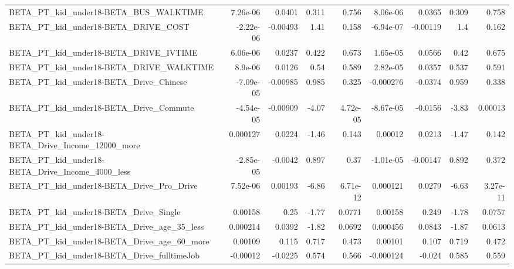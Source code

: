 \begin{tabular}{lrrrrrrrr}
BETA\_PT\_kid\_under18-BETA\_BUS\_WALKTIME              &    7.26e-06 &       0.0401 &     0.311 &    0.756 &   8.06e-06 &      0.0365 &        0.309 &         0.758 \\
BETA\_PT\_kid\_under18-BETA\_DRIVE\_COST                &   -2.22e-06 &     -0.00493 &      1.41 &    0.158 &  -6.94e-07 &    -0.00119 &          1.4 &         0.162 \\
BETA\_PT\_kid\_under18-BETA\_DRIVE\_IVTIME              &    6.06e-06 &       0.0237 &     0.422 &    0.673 &   1.65e-05 &      0.0566 &         0.42 &         0.675 \\
BETA\_PT\_kid\_under18-BETA\_DRIVE\_WALKTIME            &     8.9e-06 &       0.0126 &      0.54 &    0.589 &   2.82e-05 &      0.0357 &        0.537 &         0.591 \\
BETA\_PT\_kid\_under18-BETA\_Drive\_Chinese             &   -7.09e-05 &     -0.00985 &     0.985 &    0.325 &  -0.000276 &     -0.0374 &        0.959 &         0.338 \\
BETA\_PT\_kid\_under18-BETA\_Drive\_Commute             &   -4.54e-05 &     -0.00909 &     -4.07 & 4.72e-05 &  -8.67e-05 &     -0.0156 &        -3.83 &       0.00013 \\
BETA\_PT\_kid\_under18-BETA\_Drive\_Income\_12000\_more   &    0.000127 &       0.0224 &     -1.46 &    0.143 &    0.00012 &      0.0213 &        -1.47 &         0.142 \\
BETA\_PT\_kid\_under18-BETA\_Drive\_Income\_4000\_less    &   -2.85e-05 &      -0.0042 &     0.897 &     0.37 &  -1.01e-05 &    -0.00147 &        0.892 &         0.372 \\
BETA\_PT\_kid\_under18-BETA\_Drive\_Pro\_Drive           &    7.52e-06 &      0.00193 &     -6.86 & 6.71e-12 &   0.000121 &      0.0279 &        -6.63 &      3.27e-11 \\
BETA\_PT\_kid\_under18-BETA\_Drive\_Single              &     0.00158 &         0.25 &     -1.77 &   0.0771 &    0.00158 &       0.249 &        -1.78 &        0.0757 \\
BETA\_PT\_kid\_under18-BETA\_Drive\_age\_35\_less         &    0.000214 &       0.0392 &     -1.82 &   0.0692 &   0.000456 &      0.0843 &        -1.87 &        0.0613 \\
BETA\_PT\_kid\_under18-BETA\_Drive\_age\_60\_more         &     0.00109 &        0.115 &     0.717 &    0.473 &    0.00101 &       0.107 &        0.719 &         0.472 \\
BETA\_PT\_kid\_under18-BETA\_Drive\_fulltimeJob         &    -0.00012 &      -0.0225 &     0.574 &    0.566 &  -0.000124 &      -0.024 &        0.585 &         0.559 \\

\end{tabular}

